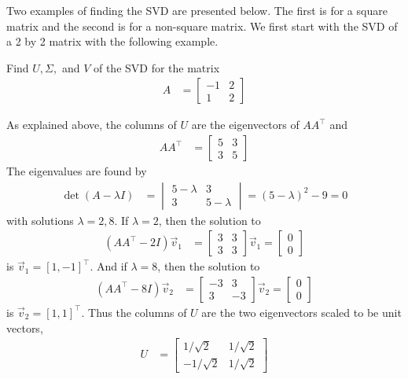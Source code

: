 Two examples of finding the SVD are presented below.  The first is for a square matrix and the second is for a non-square matrix.  We first start with the SVD of a 2 by 2 matrix with the following example. 
\begin{example} \label{ex:svd:2by2}
Find $U, \Sigma,$ and $V$ of the SVD for the matrix
\begin{align*}
A & = \begin{bmatrix}
-1 & 2 \\
1 & 2 
\end{bmatrix}
\end{align*}

\solution

As explained above, the columns of $U$ are the eigenvectors of $AA^{\intercal}$ and 
\begin{align*}
A A^{\intercal} & = \begin{bmatrix}
5 & 3 \\
3 & 5
\end{bmatrix}
\end{align*}
The eigenvalues are found by 
%
\begin{align*}
\det(A-\lambda I) & = \begin{vmatrix}
5 - \lambda & 3 \\ 3 & 5- \lambda 
\end{vmatrix} = (5-\lambda)^2 - 9  = 0
\end{align*}
with solutions $\lambda = 2, 8$.  If $\lambda = 2$, then the solution to 
\begin{align*}
(AA^{\intercal}-2I)\vec{v}_1 & = \begin{bmatrix}
3 & 3 \\ 3 & 3 
\end{bmatrix}\vec{v}_1 = \begin{bmatrix}
0 \\ 0
\end{bmatrix}
\end{align*}
is $\vec{v}_1 = [1,-1]^{\intercal}$.  And if $\lambda = 8$, then the solution to 
\begin{align*}
(AA^{\intercal}-8I) \vec{v}_2 & = \begin{bmatrix}
-3 & 3 \\
3 & -3 
\end{bmatrix} \vec{v}_2  = \begin{bmatrix}
0 \\ 0 
\end{bmatrix}
\end{align*}
is $\vec{v}_2 = [1,1]^{\intercal}$. Thus the columns of $U$ are the two eigenvectors scaled to be unit vectors, 
\begin{align*}
U & = \begin{bmatrix}
1/\sqrt{2} & 1/\sqrt{2} \\
-1/\sqrt{2} & 1/\sqrt{2}
\end{bmatrix}
\end{align*}


\end{example}
